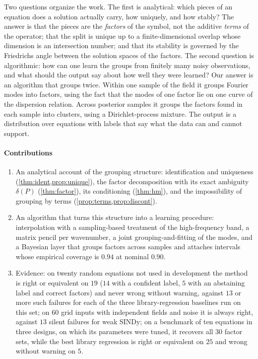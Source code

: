 \documentclass[11pt]{article}
\theoremstyle{plain}
\theoremstyle{definition}
\theoremstyle{remark}
\newcommand{\deltaP}{\delta(P)}             %
\begin{document}


Two questions organize the work. The first is analytical: which pieces of an equation does a solution actually carry,
how uniquely, and how stably? The answer is that the pieces are the \emph{factors} of the symbol, not the additive
\emph{terms} of the operator; that the split is unique up to a finite-dimensional overlap whose dimension is an
intersection number; and that its stability is governed by the Friedrichs angle between the solution spaces of the
factors. The second question is algorithmic: how can one learn the groups from finitely many noisy observations, and
what should the output say about how well they were learned? Our answer is an algorithm that groups twice. Within one
sample of the field it groups Fourier modes into factors, using the fact that the modes of one factor lie on one curve
of the dispersion relation. Across posterior samples it groups the factors found in each sample into clusters, using a
Dirichlet-process mixture. The output is a distribution over equations with labels that say what the data can and
cannot support.

\paragraph{Contributions}
\begin{enumerate}
  \item An analytical account of the grouping structure: identification and uniqueness (\cref{thm:ident,prop:unique}),
  the factor decomposition with its exact ambiguity $\deltaP$ (\cref{thm:factor}), its conditioning
  (\cref{thm:hm}), and the impossibility of grouping by terms (\cref{prop:terms,prop:discont}).
  \item An algorithm that turns this structure into a learning procedure: interpolation with a sampling-based
  treatment of the high-frequency band, a matrix pencil per wavenumber, a joint grouping-and-fitting of the modes, and
  a Bayesian layer that groups factors across samples and attaches intervals whose empirical coverage is
  $0.94$ at nominal $0.90$.
  \item Evidence: on twenty random equations not used in development the method is right or equivalent on $19$
  ($14$ with a confident label, $5$ with an abstaining label and correct factors) and never wrong without warning,
  against $13$ or more such failures for each of the three library-regression baselines run on this set; on $60$ grid
  inputs with independent fields and noise it is always right, against $13$ silent failures for weak SINDy; on a
  benchmark of ten equations in three designs, on which its parameters were tuned, it recovers all $30$ factor
  sets, while the best library regression is right or equivalent on $25$ and wrong without warning on $5$.
\end{enumerate}
\end{document}
